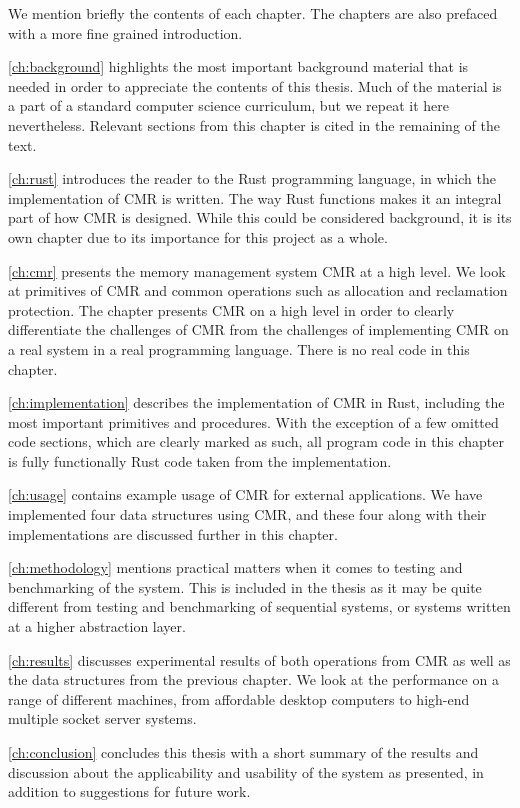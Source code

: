 We mention briefly the contents of each chapter. The chapters are also prefaced with a more fine
grained introduction.

\cref{ch:background} highlights the most important background material that is needed in order to
appreciate the contents of this thesis. Much of the material is a part of a standard computer
science curriculum, but we repeat it here nevertheless. Relevant sections from this chapter is
cited in the remaining of the text.

\cref{ch:rust} introduces the reader to the Rust programming language, in which the implementation
of CMR is written. The way Rust functions makes it an integral part of how CMR is designed. While
this could be considered background, it is its own chapter due to its importance for this project as
a whole.

\cref{ch:cmr} presents the memory management system CMR at a high level.  We look at primitives of
CMR and common operations such as allocation and reclamation protection.  The chapter presents CMR
on a high level in order to clearly differentiate the challenges of CMR from the challenges of
implementing CMR on a real system in a real programming language. There is no real code in this
chapter.

\cref{ch:implementation} describes the implementation of CMR in Rust, including the most important
primitives and procedures. With the exception of a few omitted code sections, which are clearly
marked as such, all program code in this chapter is fully functionally Rust code taken from the
implementation.

\cref{ch:usage} contains example usage of CMR for external applications. We have implemented four
data structures using CMR, and these four along with their implementations are discussed further in
this chapter.

\cref{ch:methodology} mentions practical matters when it comes to testing and benchmarking of the
system. This is included in the thesis as it may be quite different from testing and benchmarking
of sequential systems, or systems written at a higher abstraction layer.

\cref{ch:results} discusses experimental results of both operations from CMR as well as the data
structures from the previous chapter. We look at the performance on a range of different machines,
from affordable desktop computers to high-end multiple socket server systems.

\cref{ch:conclusion} concludes this thesis with a short summary of the results and discussion about
the applicability and usability of the system as presented, in addition to suggestions for future
work.
